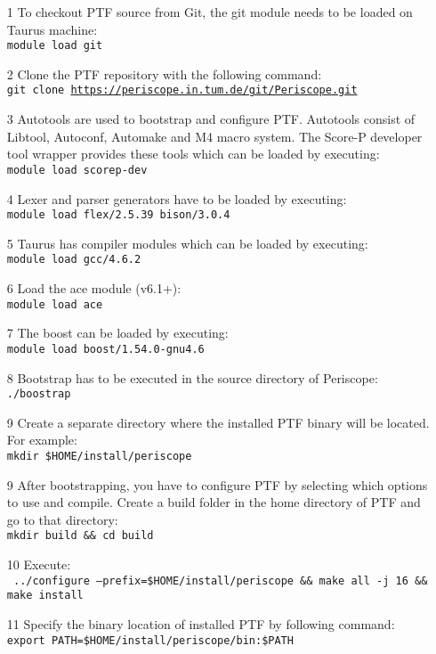 \documentclass[12pt]{article}
\begin{document}
\begin{itemize}
\item[1] To checkout PTF source from Git, the git module needs to be loaded on Taurus machine:\\
\texttt{module load git}
\item[2] Clone the PTF repository with the following command:\\
\texttt{git clone \url{https://periscope.in.tum.de/git/Periscope.git}}
\item[3] Autotools are used to bootstrap and configure PTF. Autotools consist of Libtool, Autoconf, Automake and M4 macro system. The Score-P developer tool wrapper provides these tools which can be loaded by executing:\\
\texttt{module load scorep-dev}
\item[4] Lexer and parser generators have to be loaded by executing:\\
\texttt{module load flex/2.5.39 bison/3.0.4}
\item[5] Taurus has compiler modules which can be loaded by executing:\\
\texttt{module load gcc/4.6.2}
\item[6] Load the ace module (v6.1+):\\
\texttt{module load ace}
\item[7] The boost can be loaded by executing:\\
\texttt{module load boost/1.54.0-gnu4.6}
\item[8] Bootstrap has to be executed in the source directory of Periscope:\\
\texttt{./boostrap}
\item[9] Create a separate directory where the installed PTF binary will be located. For example:\\
\texttt{mkdir \$HOME/install/periscope}
\item[9] After bootstrapping, you have to configure PTF by selecting which options
to use and compile. Create a build folder in the home directory of PTF and go to that directory:\\
\texttt{mkdir build \&\& cd build}
\item[10] Execute:\\
\texttt{ ../configure --prefix=\$HOME/install/periscope \&\& make all -j 16 \&\& make install}
\item[11] Specify the binary location of installed PTF by following command:\\
\texttt{export PATH=\$HOME/install/periscope/bin:\$PATH}
\end{itemize}
\newpage
\end{document}
